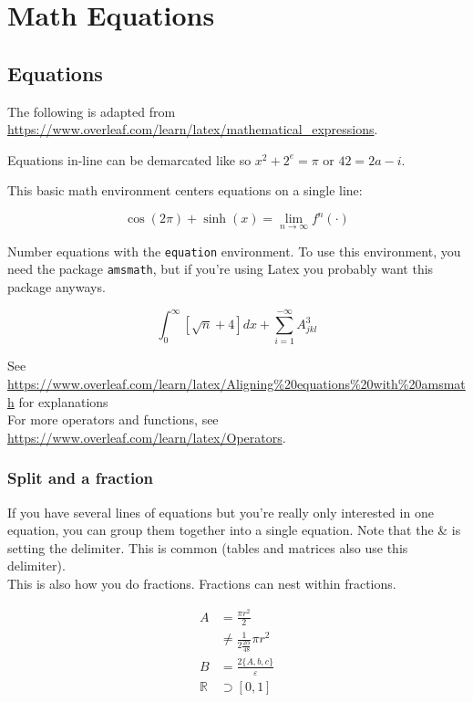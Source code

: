 
\section{Math Equations}\label{sec:math-equations}



\subsection{Equations}
The following is adapted from \url{https://www.overleaf.com/learn/latex/mathematical_expressions}.



Equations in-line can be demarcated like so \(x^2 + 2^e = \pi \) or $42=2a-i$.

This basic math environment centers equations on a single line:

\[ \cos(2\pi)+\sinh(x)=\lim_{n\to \infty} f^n(\cdot)\]

Number equations with the \verb+equation+ environment. To use this environment, you need the package \verb+amsmath+, but if you're using Latex you probably want this package anyways.

\begin{equation}
	\int_{0}^{\infty} [\sqrt{n}+4] dx + \sum_{i=1}^{-\infty} A_{jkl}^{3}
\end{equation}

See \url{https://www.overleaf.com/learn/latex/Aligning%20equations%20with%20amsmath} for explanations\\

For more operators and functions, see \url{https://www.overleaf.com/learn/latex/Operators}.\\

\subsubsection{Split and a fraction}
If you have several lines of equations but you're really only interested in one equation, you can group them together into a single equation. Note that the \& is setting the delimiter. This is common (tables and matrices also use this delimiter).\\

This is also how you do fractions. Fractions can nest within fractions.

\begin{equation} \label{eq1}
	\begin{split}
		A & = \frac{\pi r^2}{2} \\
		& \neq  \frac{1}{2\frac{2\alpha}{48}} \pi r^2\\
		B & = \frac{2\{A,b,c\}}{\varepsilon}\\
		\mathbb{R} & \supset [0,1]
	\end{split}
\end{equation}

